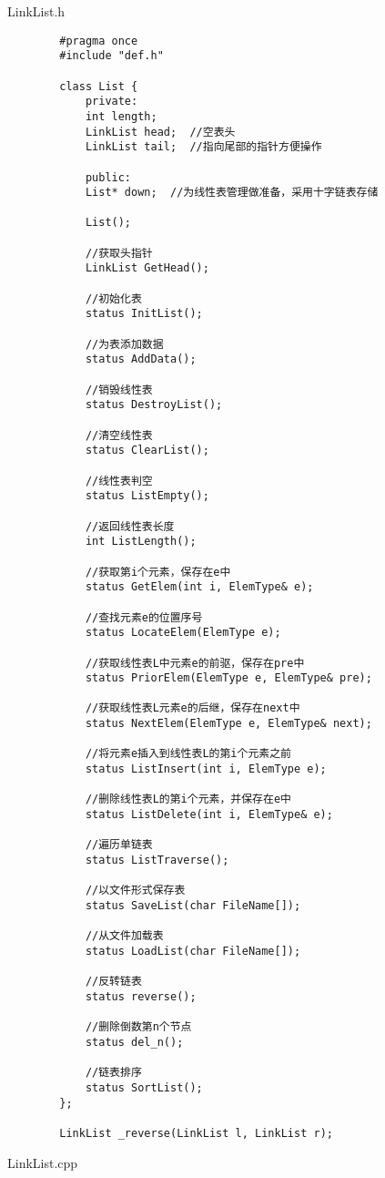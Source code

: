 \documentclass[supercite]{Experimental_Report}
\begin{document}
	LinkList.h
	\begin{lstlisting}
		#pragma once
		#include "def.h"
		
		class List {
			private:
			int length;
			LinkList head;  //空表头
			LinkList tail;  //指向尾部的指针方便操作
			
			public:
			List* down;  //为线性表管理做准备，采用十字链表存储
			
			List();
			
			//获取头指针
			LinkList GetHead();
			
			//初始化表
			status InitList();
			
			//为表添加数据
			status AddData();
			
			//销毁线性表
			status DestroyList();
			
			//清空线性表
			status ClearList();
			
			//线性表判空
			status ListEmpty();
			
			//返回线性表长度
			int ListLength();
			
			//获取第i个元素，保存在e中
			status GetElem(int i, ElemType& e);
			
			//查找元素e的位置序号
			status LocateElem(ElemType e);
			
			//获取线性表L中元素e的前驱，保存在pre中
			status PriorElem(ElemType e, ElemType& pre);
			
			//获取线性表L元素e的后继，保存在next中
			status NextElem(ElemType e, ElemType& next);
			
			//将元素e插入到线性表L的第i个元素之前
			status ListInsert(int i, ElemType e);
			
			//删除线性表L的第i个元素，并保存在e中
			status ListDelete(int i, ElemType& e);
			
			//遍历单链表
			status ListTraverse();
			
			//以文件形式保存表
			status SaveList(char FileName[]);
			
			//从文件加载表
			status LoadList(char FileName[]);
			
			//反转链表
			status reverse();
			
			//删除倒数第n个节点
			status del_n();
			
			//链表排序
			status SortList();
		};
		
		LinkList _reverse(LinkList l, LinkList r);
	\end{lstlisting}
	LinkList.cpp
\end{document}
